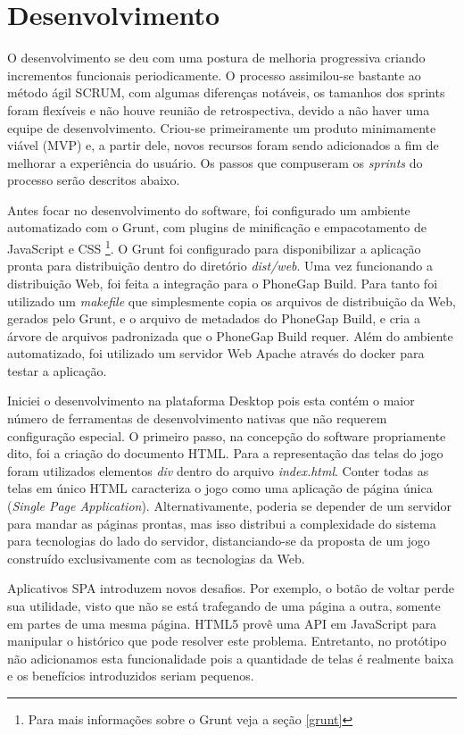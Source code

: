 \section{Desenvolvimento}

O desenvolvimento se deu com uma postura de melhoria progressiva criando
incrementos funcionais periodicamente. O processo assimilou-se bastante
ao método ágil SCRUM, com algumas diferenças notáveis, os tamanhos dos sprints
foram flexíveis e não houve reunião de retrospectiva, devido a não
haver uma equipe de desenvolvimento. Criou-se primeiramente um produto
minimamente viável (MVP) e, a partir dele, novos recursos foram
sendo adicionados a fim de melhorar a experiência do usuário. Os 
passos que compuseram  os \textit{sprints} do processo serão descritos abaixo.

Antes focar no desenvolvimento do software, foi configurado um ambiente
automatizado com o Grunt, com plugins de minificação e empacotamento
de JavaScript e CSS \footnote{Para mais informações sobre o Grunt
veja a seção \ref{grunt}}. O Grunt foi configurado para disponibilizar a
aplicação pronta para distribuição dentro do diretório \textit{dist/web}.
Uma vez funcionando a distribuição Web, foi feita a integração para
o PhoneGap Build. Para tanto foi utilizado um \textit{makefile} que
simplesmente copia os arquivos de distribuição da Web, gerados pelo
Grunt, e o arquivo de metadados do PhoneGap Build, e cria a árvore de
arquivos padronizada que o PhoneGap Build requer. Além do ambiente
automatizado, foi utilizado um servidor Web Apache através do docker
para testar a aplicação.

Iniciei o desenvolvimento na plataforma Desktop pois esta contém
o maior número de ferramentas de desenvolvimento nativas que não
requerem configuração especial. O primeiro passo, na concepção
do software propriamente dito, foi a criação do documento HTML.
Para a representação das telas do jogo foram utilizados elementos
\textit{div} dentro do arquivo \textit{index.html}. Conter todas
as telas em único HTML caracteriza o jogo como uma aplicação de
página única (\textit{Single Page Application}). Alternativamente,
poderia se depender de um servidor para mandar as páginas prontas,
mas isso distribui a complexidade do sistema para tecnologias do
lado do servidor, distanciando-se da proposta de um jogo construído
exclusivamente com as tecnologias da Web.

Aplicativos SPA introduzem novos desafios. Por exemplo, o botão
de voltar perde sua utilidade, visto que não se está trafegando
de uma página a outra, somente em partes de uma mesma página. HTML5
provê uma API em JavaScript para manipular o histórico que pode
resolver este problema. Entretanto, no protótipo não adicionamos
esta funcionalidade pois a quantidade de telas é realmente baixa e os
benefícios introduzidos seriam pequenos.

